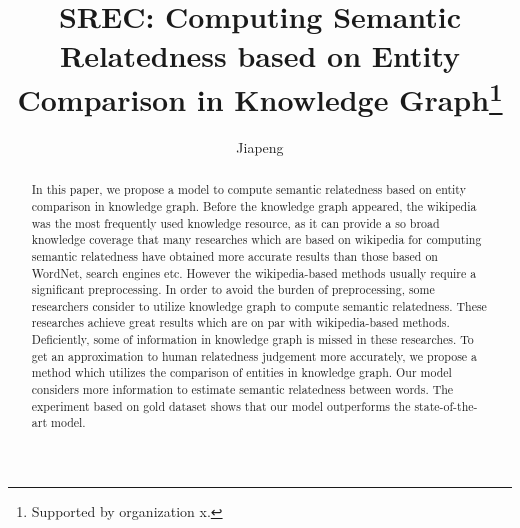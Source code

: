 \documentclass[runningheads]{llncs}
\begin{document}
  \title{SREC: Computing Semantic Relatedness based on Entity Comparison in Knowledge Graph\thanks{Supported by organization x.}}
  \author{Jiapeng }
  
  \maketitle              %
  \begin{abstract}
    In this paper, we propose a model to compute semantic relatedness based on entity comparison in knowledge graph.
    Before the knowledge graph appeared, the wikipedia was the most frequently used knowledge resource,
    as it can provide a so broad knowledge coverage that many researches which are based on wikipedia for computing semantic
    relatedness have obtained more accurate results than those based on WordNet, search engines etc.
    However the wikipedia-based methods usually require a significant preprocessing. 
    In order to avoid the burden of preprocessing, some researchers consider to utilize knowledge graph to compute semantic relatedness.
    These researches achieve great results which are on par with wikipedia-based methods. 
    Deficiently, some of information in knowledge graph is missed in these researches. 
    To get an approximation to human relatedness judgement more accurately, we propose a method which
    utilizes the comparison of entities in knowledge graph. Our model considers more information to estimate semantic relatedness between words.
    The experiment based on gold dataset shows that our model outperforms the state-of-the-art model.
  
  \end{abstract}
  
  
  
  
  

  
  
  
\end{document}
